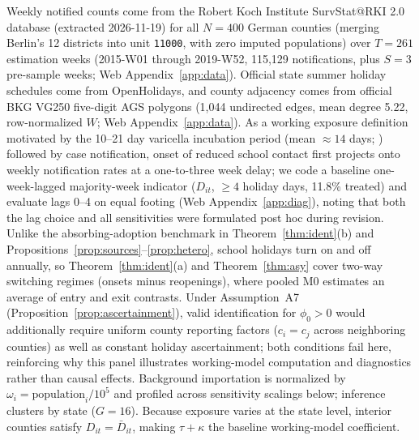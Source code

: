 Weekly notified counts come from the Robert Koch Institute SurvStat@RKI 2.0 database (extracted
2026-11-19) for all $N=400$ German counties (merging Berlin's 12 districts into unit
\texttt{11000}, with zero imputed populations) over $T=261$ estimation weeks (2015-W01 through
2019-W52, 115{,}129 notifications, plus $S=3$ pre-sample weeks; Web Appendix~\ref{app:data}).
Official state summer holiday schedules come from OpenHolidays, and county adjacency comes from
official BKG VG250 five-digit AGS polygons (1{,}044 undirected edges, mean degree 5.22,
row-normalized $W$; Web Appendix~\ref{app:data}). As a working exposure definition motivated by the
10--21 day varicella incubation period (mean $\approx 14$ days; \citealp{vink2014serial}) followed by
case notification, onset of reduced school contact first projects onto weekly notification rates at a
one-to-three week delay; we code a baseline one-week-lagged majority-week indicator ($D_{it}$, $\ge 4$
holiday days, 11.8\% treated) and evaluate lags 0--4 on equal footing (Web Appendix~\ref{app:diag}),
noting that both the lag choice and all sensitivities were formulated post hoc during revision.
Unlike the absorbing-adoption benchmark in Theorem~\ref{thm:ident}(b) and
Propositions~\ref{prop:sources}--\ref{prop:hetero}, school holidays turn on and off annually, so
Theorem~\ref{thm:ident}(a) and Theorem~\ref{thm:asy} cover two-way switching regimes (onsets minus
reopenings), where pooled M0 estimates an average of entry and exit contrasts. Under Assumption~A7
(Proposition~\ref{prop:ascertainment}), valid identification for $\phi_0>0$ would additionally
require uniform county reporting factors ($c_i=c_j$ across neighboring counties) as well as constant
holiday ascertainment; both conditions fail here, reinforcing why this panel illustrates working-model
computation and diagnostics rather than causal effects. Background importation is normalized by
$\omega_i=\text{population}_i/10^5$ and profiled across sensitivity scalings below; inference clusters by state
($G=16$). Because exposure varies at the state level, interior counties satisfy $D_{it}=\bar D_{it}$,
making $\tau+\kappa$ the baseline working-model coefficient.

